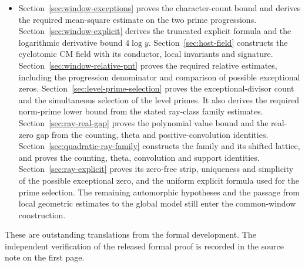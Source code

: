 \documentclass[10pt]{article}
\begin{document}
\begin{itemize}
model and proportionality theorem, local isometry, strong approximation,
and the construction of the global integral model with its level structures.
Sections~\ref{sec:boundary-periods} and~\ref{sec:jet-connection}
identify the boundary periods and derive the connection and twist comparisons
on their respective domains. Section~\ref{sec:key-different} gives the fourth-root descent and the separate
different bound. Section~\ref{sec:key-rule-dvr} proves the integral comparison at residue
primes dividing an auxiliary denominator by changing invariants and comparing
their powers. The transverse intersections, determinant comparison and
connected-family input used there are specified in that section. Sections~\ref{sec:theta-translate-span}--\ref{sec:theta-unit-basis}
prove the integral spanning, the valuation statement and the primitive
frame from the specified local data. The horizontal and
mixed-characteristic comparisons use different local ideals.
\item Section~\ref{sec:window-exceptions} proves the character-count
bound and derives the required mean-square estimate on the two prime
progressions. Section~\ref{sec:window-explicit} derives the truncated explicit
formula and the logarithmic derivative bound \(4\log y\). Section~\ref{sec:host-field} constructs the cyclotomic CM field with its
conductor, local invariants and signature. Section~\ref{sec:window-relative-pnt} proves the required relative estimates,
including the progression denominator and comparison of possible exceptional
zeros. Section~\ref{sec:level-prime-selection} proves the exceptional-divisor
count and the simultaneous selection of the level primes. It also derives
the required norm-prime lower bound from the stated ray-class family
estimates. Section~\ref{sec:ray-real-gap} proves the polynomial value bound
and the real-zero gap from the counting, theta and positive-convolution
identities. Section~\ref{sec:quadratic-ray-family} constructs the family and its
shifted lattice, and proves the counting, theta, convolution and support
identities. Section~\ref{sec:ray-explicit} proves its zero-free strip,
uniqueness and simplicity of the possible exceptional zero, and the
uniform explicit formula used for the prime selection. The remaining
automorphic hypotheses and the passage from local geometric estimates to
the global model still enter the common-window construction.
\end{itemize}
These are outstanding translations from the formal development.
The independent verification of the released formal proof is recorded
in the source note on the first page.
\end{document}
